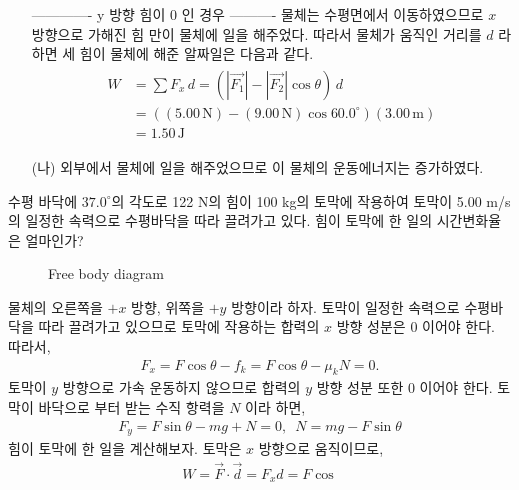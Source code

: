 \documentclass[floatfix,nofootinbib,superscriptaddress,fleqn,preprint]{revtex4}
\begin{document}
\begin{itemize}
  ------------- y 방향 힘이 0 인 경우 ----------
 물체는 수평면에서 이동하였으므로 $x$ 방향으로 가해진 힘 만이 물체에 일을 해주었다. 
 따라서 물체가 움직인 거리를 $d$ 라 하면 세 힘이 물체에 해준 알짜일은 다음과 같다.
 \begin{align}
  \begin{split}
    W &= \sum F_x\,d= \left(|\vec{F_1}|-|\vec{F_2}|\cos{\theta}\right)\,d \\
    &= \left((5.00\,\mathrm{N})-(9.00\,\mathrm{N})\cos{60.0^\circ}\right)
    (3.00\,\mathrm{m})  \\
    &= 1.50\,\mathrm{J}
  \end{split}
 \end{align}
  \item [(나)] 외부에서 물체에 일을 해주었으므로 이 물체의 운동에너지는 
  증가하였다.
\end{itemize}

\vspace{1.cm}

수평 바닥에 $37.0^\circ$의 각도로 122 N의 힘이 100 kg의 토막에
작용하여 토막이 5.00 m/s의 일정한 속력으로 수평바닥을 따라 끌려가고
있다. 힘이 토막에 한 일의 시간변화율은 얼마인가?  \\

\begin{figure}
   \caption{Free body diagram}
\end{figure}

 물체의 오른쪽을 $+x$ 방향, 위쪽을 $+y$ 방향이라 하자.
토막이 일정한 속력으로 수평바닥을 따라 끌려가고 있으므로 토막에 작용하는 합력의 
$x$ 방향 성분은 0 이어야 한다. 따라서,
\begin{align}
  F_x = F\cos{\theta}-f_k = F\cos{\theta}-\mu_k N=0.
\end{align}
토막이 $y$ 방향으로 가속 운동하지 않으므로 합력의 $y$ 방향 성분 또한 0 이어야 한다. 
토막이 바닥으로 부터 받는 수직 항력을 $N$ 이라 하면,
\begin{align}
  F_y = F\sin{\theta}-mg+N = 0,\,\,\,N = mg-F\sin{\theta}
\end{align}
힘이 토막에 한 일을 계산해보자. 토막은 $x$ 방향으로 움직이므로,
\begin{align}
  W = \vec{F}\cdot\vec{d} = F_x d = F\cos
\end{align}
\end{document}
